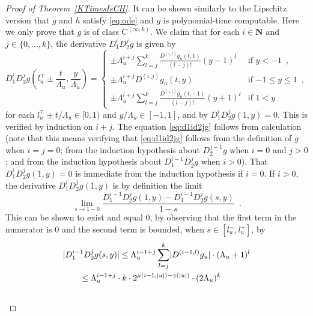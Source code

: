 \documentclass[12pt,a4paper]{article}
\theoremstyle{definition}
\theoremstyle{remark}
\newcommand{\N}{\mathbf N}
\newcommand{\D}{D}
\newcommand{\classC}{\mathrm C}
\begin{document}
\begin{proof}[Proof of Theorem~\ref{KTimesIsCH}]
It can be shown similarly to the Lipschitz version 
\cite[Theorem 3.2]{kawamura2010lipschitz}
that $g$ and $h$ satisfy \eqref{eq:ode} and $g$ is polynomial-time computable.
Here we only prove that $g$ is of class $\classC^{(\infty, k)}$.
We claim that 
for each $i \in \N$ and $j \in \{0, \dots, k\}$, 
the derivative $\D _1 ^i \D _2 ^j g$ is given by 
\begin{equation}
   \D_1^i \D_2^j g \left(l^\mp_u \pm \frac{t}{\Lambda_u}, \frac{y}{\Lambda_u}\right)
   = \begin{cases}
      \pm \Lambda_u^{i+j} \sum^{k}_{l=j} \frac{\D^{(i,l)} g_u(t,1)}{(l-j)!}
      (y - 1)^l &  \text{if } y < -1 \enspace ,
      \\
      \pm \Lambda_u^{i+j} \D^{(i, j)} g_u(t, y) & \text{if } {-1} \le y \le 1 \enspace ,
      \\
      \pm \Lambda_u^{i+j} \sum^{k}_{l=j} 
      \frac{\D^{(i,l)} g_u(t, -1)}{(l-j)!} (y + 1)^l &  \text{if } 1<y
    \end{cases}  \label{eq:d1id2jg}
\end{equation}
for each $l_u^\mp \pm t/\Lambda_u \in [0,1)$ and $y/\Lambda_u \in [-1, 1]$, 
and by $\D _1 ^i \D _2 ^j g (1, y) = 0$. 
This is verified by induction on $i + j$. 
The equation \eqref{eq:d1id2jg} follows from calculation 
(note that this means verifying 
that \eqref{eq:d1id2jg} follows from the definition of $g$ when $i = j = 0$; 
from the induction hypothesis about $\D _2 ^{j - 1} g$ when $i = 0$ and $j > 0$; 
and from the induction hypothesis about $\D _1 ^{i - 1} \D _2 ^j g$ when $i > 0$).
That $\D _1 ^i \D _2 ^j g (1, y) = 0$ is 
immediate from the induction hypothesis if $i = 0$. 
If $i > 0$, the derivative
$\D_1^i \D_2^j g (1, y)$ is by definition the limit 
\begin{equation}
\lim_{s \to 1 - 0} \frac{\D_1^{i-1} \D_2^j g(1, y) - \D_1^{i-1} \D_2^j g (s, y)}{1 - s} \enspace .
\label{eq:limitofderivative}
\end{equation}
This can be shown to exist and equal $0$, 
by observing that the first term in the numerator is $0$
and the second term is bounded, when $s \in [l ^- _u, l ^+ _u]$, by 
 \begin{align}
&
  \lvert
   \D_1^{i-1} \D_2^j g (s, y)
  \rvert
  \le 
  \Lambda_u^{i-1+j} \sum^{k}_{l=j} \lvert \D^{(i-1,l)} g_u \rvert \cdot (\Lambda_u + 1)^l 
  \notag
\\
& \qquad
 \le
  \Lambda_u^{i-1+j}  \cdot k \cdot 2^{\mu(i-1, |u|) - \gamma(|u|)} \cdot (2\Lambda_u)^k
  \notag
\\
& \qquad

\end{align}
\end{proof}
\end{document}
